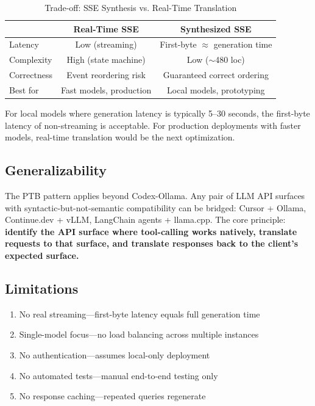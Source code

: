\documentclass[11pt,a4paper]{article}
\begin{document}
\begin{table}[H]
\centering
\caption{Trade-off: SSE Synthesis vs. Real-Time Translation}
\begin{tabular}{lcc}
\toprule
& \textbf{Real-Time SSE} & \textbf{Synthesized SSE} \\
\midrule
Latency       & Low (streaming)  & First-byte $\approx$ generation time \\
Complexity    & High (state machine) & Low ($\sim$480 loc) \\
Correctness   & Event reordering risk & Guaranteed correct ordering \\
Best for      & Fast models, production & Local models, prototyping \\
\bottomrule
\end{tabular}
\end{table}

For local models where generation latency is typically 5--30 seconds, the
first-byte latency of non-streaming is acceptable. For production deployments
with faster models, real-time translation would be the next optimization.

\subsection{Generalizability}

The PTB pattern applies beyond Codex-Ollama. Any pair of LLM API surfaces
with syntactic-but-not-semantic compatibility can be bridged: Cursor +
Ollama, Continue.dev + vLLM, LangChain agents + llama.cpp. The core
principle: \textbf{identify the API surface where tool-calling works
natively, translate requests to that surface, and translate responses back
to the client's expected surface.}

\subsection{Limitations}

\begin{enumerate}[nosep]
  \item No real streaming---first-byte latency equals full generation time
  \item Single-model focus---no load balancing across multiple instances
  \item No authentication---assumes local-only deployment
  \item No automated tests---manual end-to-end testing only
  \item No response caching---repeated queries regenerate
\end{enumerate}
\end{document}
